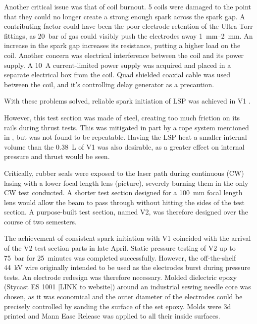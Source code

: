 
Another critical issue was that of coil burnout. 5 coils were damaged to the point that they could no longer create a strong enough spark across the spark gap. A contributing factor could have been the poor electrode retention of the Ultra-Torr fittings, as \qty{20}{bar} of gas could visibly push the electrodes away \qtyrange{1}{2}{mm}. An increase in the spark gap increases its resistance, putting a higher load on the coil. Another concern was electrical interference between the coil and its power supply. A \qty{10}{A} current-limited power supply was acquired and placed in a separate electrical box from the coil. Quad shielded coaxial cable was used between the coil, and it's controlling delay generator as a precaution. 


With these problems solved, reliable spark initiation of LSP was achieved in V1 . 

However, this test section was made of steel, creating too much friction on its rails during thrust tests. This was mitigated in part by a rope system mentioned in \textcite{duplayArgonLaserPlasmaThruster2024a}, but was not found to be repeatable. Having the LSP heat a smaller internal volume than the \qty{0.38}{L} of V1 was also desirable, as a greater effect on internal pressure and thrust would be seen.

Critically, rubber seals were exposed to the laser path during continuous (CW) lasing with a lower focal length lens (picture), severely burning them in the only CW test conducted. A shorter test section designed for a \qty{100}{mm} focal length lens would allow the beam to pass through without hitting the sides of the test section. A purpose-built test section, named V2, was therefore designed over the course of two semesters. 

The achievement of consistent spark initiation with V1 coincided with the arrival of the V2 test section parts in late April. Static pressure testing of V2 up to \qty{75}{bar} for \qty{25}{minutes} was completed successfully. However, the off-the-shelf \qty{44}{kV} wire originally intended to be used as the electrodes burst during pressure tests. An electrode redesign was therefore necessary. Molded dielectric epoxy (Stycast ES 1001 [LINK to website]) around an industrial sewing needle core was chosen, as it was economical and the outer diameter of the electrodes could be precisely controlled by sanding the surface of the set epoxy. Molds were 3d printed and Mann Ease Release was applied to all their inside surfaces.

